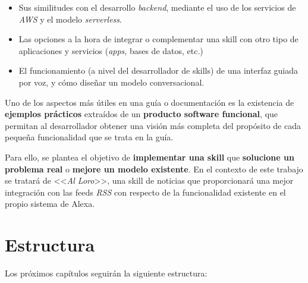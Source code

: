 \documentclass[11pt,spanish,listoffigures,listoftables,table,hyphens,dvipsnames]{tfgetsinf}
\begin{document}
\begin{itemize}
   \item Sus similitudes con el desarrollo \emph{backend}, mediante el uso de los servicios de \emph{AWS} y el modelo \emph{serverless}.
   \item Las opciones a la hora de integrar o complementar una skill con otro tipo de aplicaciones y servicios (\emph{apps}, bases de datos, etc.)
   \item El funcionamiento (a nivel del desarrollador de skills) de una interfaz guiada por voz, y cómo diseñar un modelo conversacional.
\end{itemize}

Uno de los aspectos más útiles en una guía o documentación es la existencia de \textbf{ejemplos prácticos} extraídos de un \textbf{producto software funcional}, que permitan al desarrollador obtener una visión más completa del propósito de cada pequeña funcionalidad que se trata en la guía.

Para ello, se plantea el objetivo de \textbf{implementar una skill} que \textbf{solucione un problema real} o \textbf{mejore un modelo existente}. En el contexto de este trabajo se tratará de <<\emph{Al Loro}>>, una skill de noticias que proporcionará una mejor integración con las feeds \emph{RSS} con respecto de la funcionalidad existente en el propio sistema de Alexa.

\section{Estructura}

Los próximos capítulos seguirán la siguiente estructura:
\end{document}
